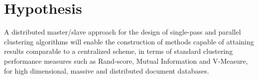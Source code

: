 \documentclass[10pt]{article}
\begin{document}
\section{Hypothesis}
A distributed master/slave approach for the design of single-pass and parallel clustering algorithms will enable the construction of methods capable of attaining results comparable to a centralized scheme, in terms of standard clustering performance measures such as Rand-score, Mutual Information and V-Measure, for high dimensional, massive and distributed document databases.

\end{document}
